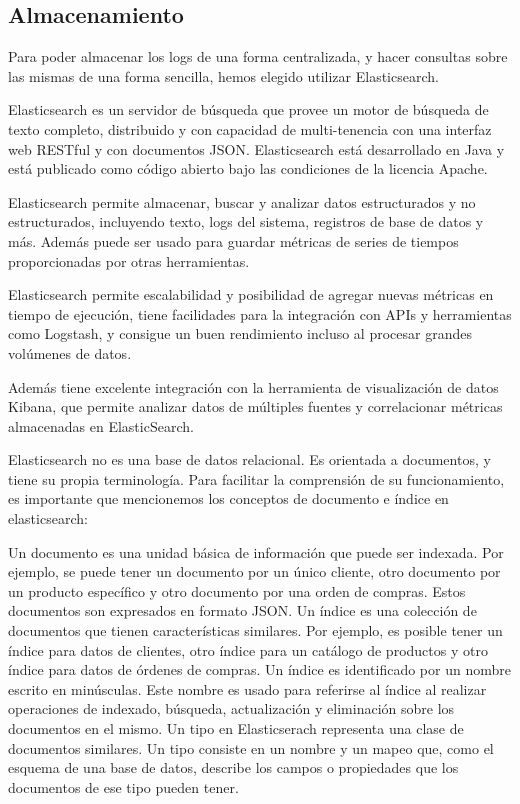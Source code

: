 \subsection{Almacenamiento}
\label{almacenamiento}

Para poder almacenar los logs de una forma centralizada, y hacer consultas
sobre las mismas de una forma sencilla, hemos elegido utilizar Elasticsearch.

Elasticsearch es un servidor de búsqueda que provee un motor de búsqueda de
texto completo, distribuido y con capacidad de multi-tenencia con una interfaz
web RESTful y con documentos JSON. Elasticsearch está desarrollado en Java y
está publicado como código abierto bajo las condiciones de la licencia Apache.

Elasticsearch permite almacenar, buscar y analizar datos estructurados y no
estructurados, incluyendo texto, logs del sistema, registros de base de datos y
más. Además puede ser usado para guardar métricas de series de tiempos
proporcionadas por otras herramientas.

Elasticsearch permite escalabilidad y posibilidad de agregar nuevas métricas en
tiempo de ejecución, tiene facilidades para la integración con APIs y
herramientas como Logstash, y consigue un buen rendimiento incluso al procesar
grandes volúmenes de datos.

Además tiene excelente integración con la herramienta de visualización de datos
Kibana, que permite analizar datos de múltiples fuentes y correlacionar
métricas almacenadas en ElasticSearch.

Elasticsearch no es una base de datos relacional. Es orientada a documentos, y
tiene su propia terminología. Para facilitar la comprensión de su
funcionamiento, es importante que mencionemos los conceptos de documento e
índice en elasticsearch:

Un documento es una unidad básica de información que puede ser indexada. Por
ejemplo, se puede tener un documento por un único cliente, otro documento por
un producto específico y otro documento por una orden de compras. Estos
documentos son expresados en formato JSON.  Un índice es una colección de
documentos que tienen características similares. Por ejemplo, es posible tener
un índice para datos de clientes, otro índice para un catálogo de productos y
otro índice para datos de órdenes de compras. Un índice es identificado por un
nombre escrito en minúsculas. Este nombre es usado para referirse al índice al
realizar operaciones de indexado, búsqueda, actualización y eliminación sobre
los documentos en el mismo.  Un tipo en Elasticserach representa una clase de
documentos similares. Un tipo consiste en un nombre y un mapeo que, como el
esquema de una base de datos, describe los campos o propiedades que los
documentos de ese tipo pueden tener.


